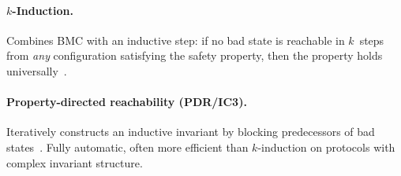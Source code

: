 \paragraph{$k$-Induction.}
Combines BMC with an inductive step: if no bad state is reachable in
$k$~steps from \emph{any} configuration satisfying the safety property,
then the property holds universally~\cite{SheehySSS2000}.

\paragraph{Property-directed reachability (PDR/IC3).}
Iteratively constructs an inductive invariant by blocking predecessors
of bad states~\cite{Bradley2011}.  Fully automatic, often more efficient
than $k$-induction on protocols with complex invariant structure.
